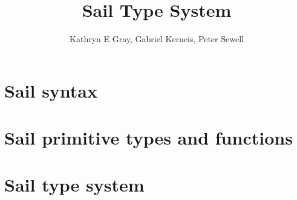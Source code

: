 \documentclass[11pt]{article}
\begin{document}


\title{Sail Type System}
\author{Kathryn E Gray, Gabriel Kerneis, Peter Sewell}

\maketitle

\tableofcontents

\newpage

\section{Sail syntax}

\ottgrammartabular{
\ottl\ottinterrule
\ottannot\ottinterrule
\ottid\ottinterrule
\ottkid\ottinterrule
\ottbaseXXkind\ottinterrule
\ottkind\ottinterrule
\ottnexp\ottinterrule
\ottorder\ottinterrule
\ottbaseXXeffect\ottinterrule
\otteffect\ottinterrule
\otttyp\ottinterrule
\otttypXXarg\ottinterrule
\ottnXXconstraint\ottinterrule
\ottkindedXXid\ottinterrule
\ottquantXXitem\ottinterrule
\otttypquant\ottinterrule
\otttypschm\ottinterrule
\ottnameXXscmXXopt\ottinterrule
\otttypeXXdef\ottinterrule
\otttypeXXunion\ottinterrule
\ottindexXXrange\ottinterrule
\ottlit\ottinterrule
\ottsemiXXopt\ottinterrule
\ottpat\ottinterrule
\ottfpat\ottinterrule
\ottexp\ottinterrule
\ottlexp\ottinterrule
\ottfexp\ottinterrule
\ottfexps\ottinterrule
\ottoptXXdefault\ottinterrule
\ottpexp\ottinterrule
\otttannotXXopt\ottinterrule
\ottrecXXopt\ottinterrule
\otteffectXXopt\ottinterrule
\ottfuncl\ottinterrule
\ottfundef\ottinterrule
\ottletbind\ottinterrule
\ottvalXXspec\ottinterrule
\ottdefaultXXspec\ottinterrule
\ottscatteredXXdef\ottinterrule
\ottregXXid\ottinterrule
\ottaliasXXspec\ottinterrule
\ottdecXXspec\ottinterrule
\ottdef\ottinterrule
\ottdefs\ottinterrule}

\newpage
\section{Sail primitive types and functions}

\ottgrammartabular{
\ottbuiltXXinXXtypes\ottinterrule}

\ottgrammartabular{
\ottbuiltXXinXXtypeXXabbreviations\ottinterrule
\ottfunctions\ottinterrule
\ottfunctionsXXwithXXcoercions\ottinterrule}
\newpage

\section{Sail type system}
\end{document}
